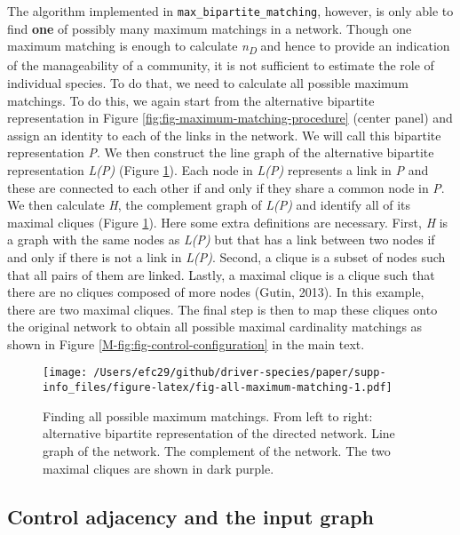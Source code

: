 \documentclass[a4paper]{artikel1}
\theoremstyle{definition}
\theoremstyle{definition}
\theoremstyle{definition}
\theoremstyle{remark}
\begin{document}
The algorithm implemented in \texttt{max\_bipartite\_matching}, however,
is only able to find \textbf{one} of possibly many maximum matchings in
a network. Though one maximum matching is enough to calculate
\emph{n\textsubscript{D}} and hence to provide an indication of the
manageability of a community, it is not sufficient to estimate the role
of individual species. To do that, we need to calculate all possible
maximum matchings. To do this, we again start from the alternative
bipartite representation in Figure
\ref{fig:fig-maximum-matching-procedure} (center panel) and assign an
identity to each of the links in the network. We will call this
bipartite representation \emph{P}. We then construct the line graph of
the alternative bipartite representation \emph{L(P)} (Figure
\ref{fig:fig-all-maximum-matching}). Each node in \emph{L(P)} represents
a link in \emph{P} and these are connected to each other if and only if
they share a common node in \emph{P}. We then calculate \emph{H}, the
complement graph of \emph{L(P)} and identify all of its maximal cliques
(Figure \ref{fig:fig-all-maximum-matching}). Here some extra definitions
are necessary. First, \emph{H} is a graph with the same nodes as
\emph{L(P)} but that has a link between two nodes if and only if there
is not a link in \emph{L(P)}. Second, a clique is a subset of nodes such
that all pairs of them are linked. Lastly, a maximal clique is a clique
such that there are no cliques composed of more nodes (Gutin, 2013). In
this example, there are two maximal cliques. The final step is then to
map these cliques onto the original network to obtain all possible
maximal cardinality matchings as shown in Figure
\ref{M-fig:fig-control-configuration} in the main text.

\begin{figure}
\centering
\texttt{[image: /Users/efc29/github/driver-species/paper/supp-info\_files/figure-latex/fig-all-maximum-matching-1.pdf]}
\caption{\label{fig:fig-all-maximum-matching}Finding all possible maximum
matchings. From left to right: alternative bipartite representation of
the directed network. Line graph of the network. The complement of the
network. The two maximal cliques are shown in dark purple.}
\end{figure}

\clearpage

\subsection{Control adjacency and the input graph}\label{input-graph}
\end{document}
